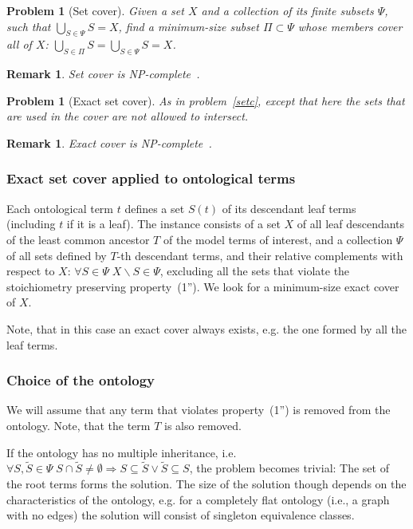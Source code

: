 \documentclass[9pt]{article}
\newcounter{pbm}
\newcounter{def}
\newcounter{rm}
\begin{document}
\newtheorem{setc}[pbm]{Problem}
\begin{setc}[Set cover]
Given a set $X$ and a collection of its finite subsets $\Psi$, such that $\bigcup_{S \in \Psi} S = X$, find a minimum-size subset $\Pi \subset \Psi$ whose members cover all of $X$: $\bigcup_{S \in \Pi} S = \bigcup_{S \in \Psi} S = X$.
\end{setc}
\newtheorem{rem}[rm]{Remark}
\begin{rem}
 Set cover is \textit{NP}-complete~\citep{karp72}.
\end{rem}

\newtheorem{esetc}[pbm]{Problem}
\begin{esetc}[Exact set cover]
As in problem~\ref{setc}, except that here the sets that are used in the cover are not allowed to intersect. 
\end{esetc}
\newtheorem{rem1}[rm]{Remark}
\begin{rem1}
Exact cover is \textit{NP}-complete~\citep{Goldreich2008}.
\end{rem1}

\subsubsection*{Exact set cover applied to ontological terms}
Each ontological term $t$ defines a set $S(t)$ of its descendant leaf terms (including $t$ if it is a leaf). The instance consists of a set $X$ of all leaf descendants of the least common ancestor $T$ of the model terms of interest, and a collection $\Psi$ of all sets defined by $T$-th descendant terms, and their relative complements with respect to $X$: $\forall S \in \Psi \; X\backslash S \in \Psi$, excluding all the sets that violate the stoichiometry preserving property~(1''). We look for a minimum-size exact cover of $X$. 

Note, that in this case an exact cover always exists, e.g. the one formed by all the leaf terms.

\subsubsection*{Choice of the ontology}
We will assume that any term that violates property~(1'') is removed from the ontology. Note, that the term $T$ is also removed.

If the ontology has no multiple inheritance, i.e. $\forall S, \tilde{S} \in \Psi \; S \cap \tilde{S} \neq \emptyset \Rightarrow S \subseteq \tilde{S} \lor \tilde{S} \subseteq S$, the problem becomes trivial: The set of the root terms forms the solution. The size of the solution though depends on the characteristics of the ontology, e.g. for a completely flat ontology (i.e., a graph with no edges) the solution will consist of singleton equivalence classes.
\end{document}
